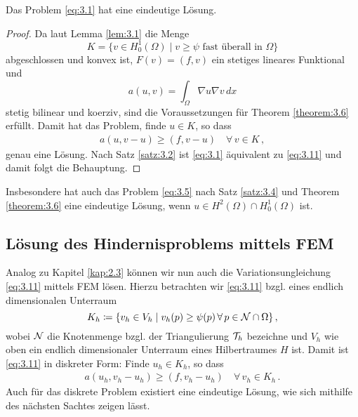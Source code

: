 \newpage

\begin{kor}\label{kor:3.7}
Das Problem \eqref{eq:3.1} hat eine eindeutige Lösung.
\end{kor}

\begin{proof}
Da laut Lemma \ref{lem:3.1} die Menge 
\[
	K=\{v \in H^1_0(\Omega) \mid v \ge \psi \text{ fast überall in }\Omega\}
\]
abgeschlossen und konvex ist, $F(v) = (f,v)$ ein stetiges lineares Funktional und 
\[
	a(u,v) = \int_\Omega \nabla u \nabla v \, dx
\]
stetig bilinear und koerziv, sind die Voraussetzungen für Theorem \ref{theorem:3.6} erfüllt. Damit hat das Problem, finde $u \in K$, so dass
\begin{align}\label{eq:3.11}
	a(u,v-u) \ge (f,v-u) \quad \forall \, v \in K \, ,
\end{align}
genau eine Lösung. Nach Satz \ref{satz:3.2} ist \eqref{eq:3.1} äquivalent zu \eqref{eq:3.11} und damit folgt die Behauptung.
\end{proof}


\begin{bem}\label{bem:3.8}
Insbesondere hat auch das Problem \eqref{eq:3.5} nach Satz \ref{satz:3.4} und Theorem \ref{theorem:3.6} eine eindeutige Lösung, wenn $u \in H^2(\Omega) \cap H^1_0(\Omega)$ ist.
\end{bem}







\subsection{Lösung des Hindernisproblems mittels FEM}
\label{kap:3.1.3}

Analog zu Kapitel \ref{kap:2.3} können wir nun auch die Variationsungleichung \eqref{eq:3.11} mittels FEM lösen. Hierzu betrachten wir \eqref{eq:3.11} bzgl. eines endlich dimensionalen Unterraum
\[
	K_h \coloneqq \{v_h \in V_h \mid v_h (p) \ge \psi(p) \, \forall \, p \in \mathcal N \cap \Omega\}\, ,
\]
wobei $\mathcal N$ die Knotenmenge bzgl. der Triangulierung $\mathcal T_h$ bezeichne und $V_h$ wie oben ein endlich dimensionaler Unterraum eines Hilbertraumes $H$ ist. Damit ist \eqref{eq:3.11} in diskreter Form: Finde $u_h \in K_h$, so dass
\begin{align}\label{eq:3.12}
	a(u_h,v_h-u_h) \ge (f,v_h-u_h) \quad \forall \, v_h \in K_h \, .
\end{align}
Auch für das diskrete Problem existiert eine eindeutige Lösung, wie sich mithilfe des nächsten Sachtes zeigen lässt.


